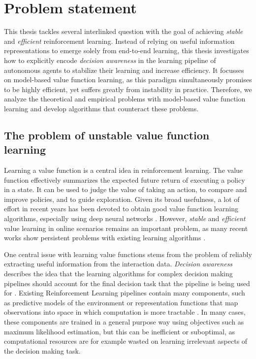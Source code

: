 \section{Problem statement}

This thesis tackles several interlinked question with the goal of achieving \emph{stable} and \emph{efficient} reinforcement learning.
Instead of relying on useful information representations to emerge solely from end-to-end learning, this thesis investigates how to explicitly encode \emph{decision awareness} in the learning pipeline of autonomous agents to stabilize their learning and increase efficiency.
It focusses on model-based value function learning, as this paradigm simultaneously promises to be highly efficient, yet suffers greatly from instability in practice.
Therefore, we analyze the theoretical and empirical problems with model-based value function learning and develop algorithms that counteract these problems.

\subsection{The problem of unstable value function learning}

Learning a value function is a central idea in reinforcement learning.
The value function effectively summarizes the expected future return of executing a policy in a state.
It can be used to judge the value of taking an action, to compare and improve policies, and to guide exploration.
Given its broad usefulness, a lot of effort in recent years has been devoted to obtain good value function learning algorithms, especially using deep neural networks \parencite{dqn,hasselt2010double,hasselt2016deep,td3,sac,}.
However, \emph{stable} and \emph{efficient} value learning in online scenarios remains an important problem, as many recent works show persistent problems with existing learning algorithms \parencite{kumar2021implicit,nikishin2022primacy,hussing2024dissecting}.

One central issue with learning value functions stems from the problem of reliably extracting useful information from the interaction data.
\emph{Decision awareness} describes the idea that the learning algorithms for complex decision making pipelines should account for the final decision task that the pipeline is being used for \parencite{vaml,grimm2020value,abachi2020policy,nikishin2021control}.
Existing Reinforcement Learning pipelines contain many components, such as predictive models of the environment \parencite{dyna,mbpo,hafner2019learning,hafner2020dream,schrittwieser2020mastering} or representation functions that map observations into space in which computation is more tractable \parencite{ferns2004metrics,le2021metrics}.
In many cases, these components are trained in a general purpose way using objectives such as maximum likelihood estimation, but this can be inefficient or suboptimal, as computational resources are for example wasted on learning irrelevant aspects of the decision making task.

